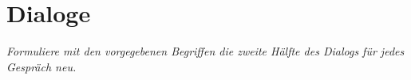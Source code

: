 \documentclass{article}
\begin{document}
\newpage
\section{Dialoge}

\noindent \textit{Formuliere mit den vorgegebenen Begriffen die zweite Hälfte des Dialogs für jedes Gespräch neu.}

%
%
%
%
%
%
%
%
%
%
%
%
%
%
%
%
%
%
%
%
\end{document}
